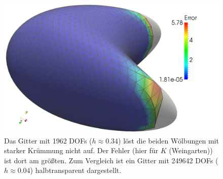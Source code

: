 \begin{figure}
    \label{figErrCompSphere}
    \centering\includegraphics[width=\textwidth]{bilder/Curvature/HeineB2k250kMeshGaussError.png}
    \caption[Gitterauflösung (quatrische Oberfläche)]
            {Das Gitter mit 1962 DOFs (\( h\approx0.34 \)) löst die beiden Wölbungen mit starker Krümmung
            nicht auf. Der Fehler (hier für \( K \) (Weingarten)) ist dort am größten. 
            Zum Vergleich ist ein Gitter mit 249642 DOFs (\( h\approx0.04 \)) halbtransparent
            dargestellt.}
    \label{figHeineBResolution}
  \end{figure}

